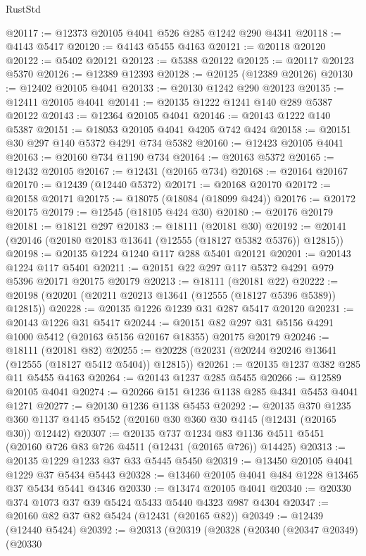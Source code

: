 \begin{lexlean}{RustStd}
\begin{coremodule}
@20117 := @12373 @20105 @4041 @526 @285 @1242 @290 @4341
@20118 := @4143 @5417
@20120 := @4143 @5455 @4163
@20121 := @20118 @20120
@20122 := @5402 @20121
@20123 := @5388 @20122
@20125 := @20117 @20123 @5370
@20126 := @12389 @12393
@20128 := @20125 (@12389 @20126)
@20130 := @12402 @20105 @4041
@20133 := @20130 @1242 @290 @20123
@20135 := @12411 @20105 @4041
@20141 := @20135 @1222 @1241 @140 @289 @5387 @20122
@20143 := @12364 @20105 @4041
@20146 := @20143 @1222 @140 @5387
@20151 := @18053 @20105 @4041 @4205 @742 @424
@20158 := @20151 @30 @297 @140 @5372 @4291 @734 @5382
@20160 := @12423 @20105 @4041
@20163 := @20160 @734 @1190 @734
@20164 := @20163 @5372
@20165 := @12432 @20105
@20167 := @12431 (@20165 @734)
@20168 := @20164 @20167
@20170 := @12439 (@12440 @5372)
@20171 := @20168 @20170
@20172 := @20158 @20171
@20175 := @18075 (@18084 (@18099 @424))
@20176 := @20172 @20175
@20179 := @12545 (@18105 @424 @30)
@20180 := @20176 @20179
@20181 := @18121 @297
@20183 := @18111 (@20181 @30)
@20192 := @20141 (@20146 (@20180 @20183 @13641 (@12555 (@18127 @5382 @5376)) @12815))
@20198 := @20135 @1224 @1240 @117 @288 @5401 @20121
@20201 := @20143 @1224 @117 @5401
@20211 := @20151 @22 @297 @117 @5372 @4291 @979 @5396 @20171 @20175 @20179
@20213 := @18111 (@20181 @22)
@20222 := @20198 (@20201 (@20211 @20213 @13641 (@12555 (@18127 @5396 @5389)) @12815))
@20228 := @20135 @1226 @1239 @31 @287 @5417 @20120
@20231 := @20143 @1226 @31 @5417
@20244 := @20151 @82 @297 @31 @5156 @4291 @1000 @5412 (@20163 @5156 @20167 @18355) @20175 @20179
@20246 := @18111 (@20181 @82)
@20255 := @20228 (@20231 (@20244 @20246 @13641 (@12555 (@18127 @5412 @5404)) @12815))
@20261 := @20135 @1237 @382 @285 @11 @5455 @4163
@20264 := @20143 @1237 @285 @5455
@20266 := @12589 @20105 @4041
@20274 := @20266 @151 @1236 @1138 @285 @4341 @5453 @4041 @1271
@20277 := @20130 @1236 @1138 @5453
@20292 := @20135
    @370
    @1235
    @360
    @1137
    @4145
    @5452
    (@20160 @30 @360 @30 @4145 (@12431 (@20165 @30)) @12442)
@20307 := @20135
    @737
    @1234
    @83
    @1136
    @4511
    @5451
    (@20160 @726 @83 @726 @4511 (@12431 (@20165 @726)) @14425)
@20313 := @20135 @1229 @1233 @37 @33 @5445 @5450
@20319 := @13450 @20105 @4041 @1229 @37 @5434 @5443
@20328 := @13460 @20105 @4041 @484 @1228 @13465 @37 @5434 @5441 @4346
@20330 := @13474 @20105 @4041
@20340 := @20330 @374 @1073 @37 @39 @5424 @5433 @5440 @4323 @987 @4304
@20347 := @20160 @82 @37 @82 @5424 (@12431 (@20165 @82))
@20349 := @12439 (@12440 @5424)
@20392 := @20313
    (@20319
      (@20328
        (@20340
          (@20347 @20349)
          (@20330

\end{coremodule}
\end{lexlean}

